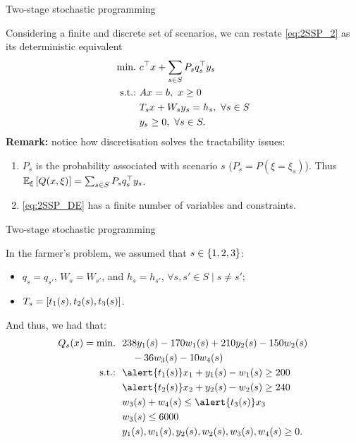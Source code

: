 \begin{frame}{Two-stage stochastic programming}

	Considering a finite and discrete set of scenarios, we can restate \eqref{eq:2SSP_2} as its \alert{deterministic equivalent}
	\begin{subequations} \label{eq:2SSP_DE}
	\begin{align}
		\mathop{\text{min.} \ }  & c^\top x + \sum_{s\in S} P_s q_s^\top y_s \\
		\mathop{\text{s.t.:} \ }	   & Ax = b, \ x \ge 0 \\
			   & T_sx + W_s y_s = h_s, \ \forall s \in S \\
			   & y_s \ge 0, \ \forall s \in S.
	\end{align}
	\end{subequations}
	\pause 
	{\bf Remark:} notice how discretisation solves the tractability issues:
	\vspace{-6pt}
	\begin{enumerate}
		\item $P_s$ is the probability associated with scenario $s$ ($P_s = P(\xi = \xi_s)$). Thus $\mathbb{E}_\xi\left[ Q(x, \xi) \right] = \sum_{s\in S} P_s q_s^\top y_s$.
		\item \eqref{eq:2SSP_DE} has a \alert{finite} number of variables and constraints.	
	\end{enumerate}


	
\end{frame}


\begin{frame}{Two-stage stochastic programming}
	
	In the farmer's problem, we assumed that $s \in \left\{ 1,2,3 \right \}$:
		\vspace{-6pt}
		\begin{itemize}
			\item $q_s = q_{s'}$, $W_s = W_{s'}$, and $h_s = h_{s'}$, $\forall s, s' \in S \mid s \neq s'$;
			\item $T_s = \left[ t_1(s), t_2(s), t_3(s) \right]$.  	
		\end{itemize}
	
	\pause
	And thus, we had that:
	\begin{align*}
		Q_s(x) = \mini \ &238y_1(s) -170w_1(s) + 210y_2(s) - 150w_2(s) \\
		& \quad -36w_3(s) -10w_4(s) \\
		\st   \ & \alert{t_1(s)}x_1 + y_1(s) - w_1(s) \geq 200 \\
                & \alert{t_2(s)}x_2 + y_2(s) - w_2(s) \geq 240 \\
                & w_3(s) + w_4(s) \leq \alert{t_3(s)}x_3 \\
                & w_3(s) \leq 6000 \\
                & y_1(s), w_1(s), y_2(s), w_2(s), w_3(s), w_4(s) \geq 0. 
	\end{align*}

	
\end{frame}


